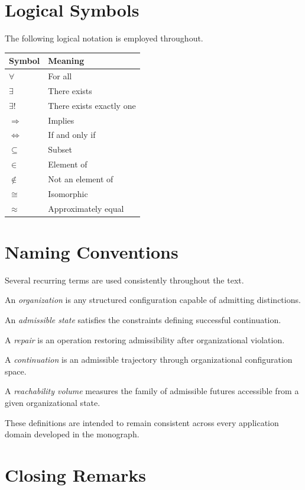 \documentclass[11pt,oneside]{book}
\numberwithin{equation}{chapter}
\theoremstyle{definition}
\theoremstyle{plain}
\begin{document}
\section{Logical Symbols}

The following logical notation is employed throughout.

\begin{center}
\begin{tabular}{ll}
\toprule
Symbol & Meaning\\
\midrule
$\forall$ & For all\\
$\exists$ & There exists\\
$\exists !$ & There exists exactly one\\
$\Rightarrow$ & Implies\\
$\Leftrightarrow$ & If and only if\\
$\subseteq$ & Subset\\
$\in$ & Element of\\
$\notin$ & Not an element of\\
$\cong$ & Isomorphic\\
$\approx$ & Approximately equal\\
\bottomrule
\end{tabular}
\end{center}

\section{Naming Conventions}

Several recurring terms are used consistently throughout the text.

An \emph{organization} is any structured configuration capable of
admitting distinctions.

An \emph{admissible state} satisfies the constraints defining successful
continuation.

A \emph{repair} is an operation restoring admissibility after
organizational violation.

A \emph{continuation} is an admissible trajectory through organizational
configuration space.

A \emph{reachability volume} measures the family of admissible futures
accessible from a given organizational state.

These definitions are intended to remain consistent across every
application domain developed in the monograph.

\section{Closing Remarks}
\end{document}

